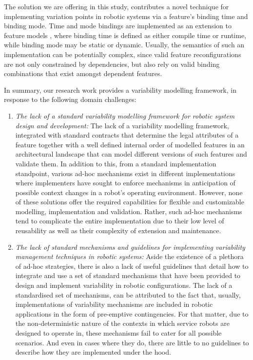 \documentclass[conference]{IEEEtran}
\begin{document}
The solution we are offering in this study, contributes a novel technique for implementing variation points in robotic systems via a feature's binding time and binding mode. Time and mode bindings are implemented as an extension to feature models \cite{flex-feat-bind}, where binding time is defined as either compile time or runtime, while binding mode may be static or dynamic. Usually, the semantics of such an implementation can be potentially complex, since valid feature reconfigurations are not only constrained by dependencies, but also rely on valid binding combinations that exist amongst dependent features.

In summary, our research work provides a variability modelling framework, in response to the following domain challenges:
\begin{enumerate}
    \item \textit{The lack of a standard variability modelling framework for robotic system design and development: }The lack of a variability modelling framework, integrated with standard contracts that determine the legal attributes of a feature together with a well defined internal order of modelled features in an architectural landscape that can model different versions of such features and validate them. In addition to this, from a standard implementation standpoint, various ad-hoc mechanisms exist in different implementations where implementers have sought to enforce mechanisms in anticipation of possible context changes in a robot's operating environment. However, none of these solutions offer the required capabilities for flexible and customizable modelling, implementation and validation. Rather, such ad-hoc mechanisms tend to complicate the entire implementation due to their low level of reusability as well as their complexity of extension and maintenance.
    
    \item \textit{The lack of standard mechanisms and guidelines for implementing variability management techniques in robotic systems:} Aside the existence of a plethora of ad-hoc strategies, there is also a lack of useful guidelines that detail how to integrate and use a set of standard mechanisms that have been provided to design and implement variability in robotic configurations. The lack of a standardised set of mechanisms, can be attributed to the fact that, usually, implementations of variability mechanisms are included in robotic applications in the form of pre-emptive contingencies. For that matter, due to the non-deterministic nature of the contexts in which service robots are designed to operate in, these mechanisms fail to cater for all possible scenarios. And even in cases where they do, there are little to no guidelines to describe how they are implemented under the hood.
    

\end{enumerate}
\end{document}
